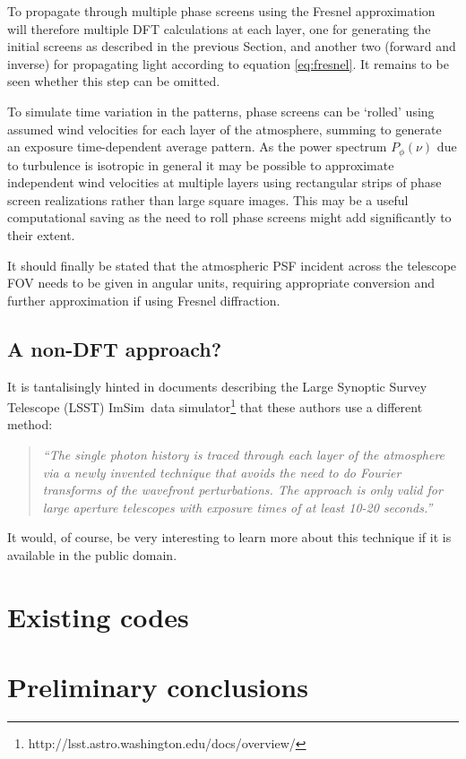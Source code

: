 \documentclass[preprint]{aastex}
\newcommand{\imsim}{{\sc ImSim}}
\begin{document}
To propagate through multiple phase screens using the Fresnel
approximation will therefore multiple DFT calculations at each layer,
one for generating the initial screens as described in the previous
Section, and another two (forward and inverse) for propagating light
according to equation \eqref{eq:fresnel}.  It remains to be seen
whether this step can be omitted.

To simulate time variation in the patterns, phase screens can be
`rolled' using assumed wind velocities for each layer of the
atmosphere, summing to generate an exposure time-dependent average pattern.  
As the power spectrum $P_{\phi}(\nu)$ due to turbulence
is isotropic in general it may be possible to approximate independent
wind velocities at multiple layers using rectangular strips of phase screen
realizations rather than large square images.  This may be a useful
computational saving as the need to roll phase screens might add
significantly to their extent.

It should finally be stated that the atmospheric PSF incident across
the telescope FOV needs to be given in angular units, requiring
appropriate conversion and further approximation if using Fresnel diffraction.

\subsection{A non-DFT approach?}
It is tantalisingly hinted in documents describing the Large Synoptic
Survey Telescope (LSST) \imsim\ data
simulator\footnote{http://lsst.astro.washington.edu/docs/overview/}
that these authors use a different method:
\begin{quote}
\emph{``The single
photon history is traced through each layer of the
atmosphere via a newly invented technique that
avoids the need to do Fourier transforms of the
wavefront perturbations. The approach is only
valid for large aperture telescopes with exposure
times of at least 10-20 seconds.''}
\end{quote}
It would, of course, be very interesting to learn more about this
technique if it is available in the public domain.

\section{Existing codes}


\section{Preliminary conclusions}
\end{document}
